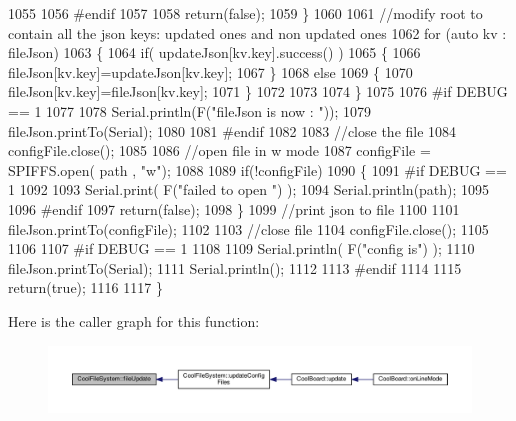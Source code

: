 \begin{DoxyCode}
1055 
1056 \textcolor{preprocessor}{    #endif}
1057 
1058         \textcolor{keywordflow}{return}(\textcolor{keyword}{false});
1059     \}
1060     
1061     \textcolor{comment}{//modify root to contain all the json keys: updated ones and non updated ones}
1062     \textcolor{keywordflow}{for} (\textcolor{keyword}{auto} kv : fileJson) 
1063     \{
1064         \textcolor{keywordflow}{if}( updateJson[kv.key].success() )
1065         \{
1066             fileJson[kv.key]=updateJson[kv.key];            
1067         \}
1068         \textcolor{keywordflow}{else}
1069         \{
1070             fileJson[kv.key]=fileJson[kv.key];
1071         \}
1072 
1073                 
1074     \}
1075 
1076 \textcolor{preprocessor}{#if DEBUG == 1}
1077 
1078     Serial.println(F(\textcolor{stringliteral}{"fileJson is now : "}));
1079     fileJson.printTo(Serial);
1080 
1081 \textcolor{preprocessor}{#endif}
1082 
1083     \textcolor{comment}{//close the file}
1084     configFile.close();
1085 
1086     \textcolor{comment}{//open file in w mode}
1087     configFile = SPIFFS.open( path , \textcolor{stringliteral}{"w"});
1088     
1089     \textcolor{keywordflow}{if}(!configFile)
1090     \{   
1091 \textcolor{preprocessor}{    #if DEBUG == 1}
1092         
1093         Serial.print( F(\textcolor{stringliteral}{"failed to open "}) );
1094         Serial.println(path);
1095 
1096 \textcolor{preprocessor}{    #endif}
1097         \textcolor{keywordflow}{return}(\textcolor{keyword}{false});
1098     \}
1099     \textcolor{comment}{//print json to file    }
1100     
1101     fileJson.printTo(configFile);
1102     
1103     \textcolor{comment}{//close file}
1104     configFile.close();
1105 
1106 
1107 \textcolor{preprocessor}{#if DEBUG == 1}
1108 
1109     Serial.println( F(\textcolor{stringliteral}{"config is"}) );
1110     fileJson.printTo(Serial);
1111     Serial.println();
1112 
1113 \textcolor{preprocessor}{#endif}
1114     
1115     \textcolor{keywordflow}{return}(\textcolor{keyword}{true});
1116     
1117 \}
\end{DoxyCode}
Here is the caller graph for this function\+:\nopagebreak
\begin{figure}[H]
\begin{center}
\leavevmode
\includegraphics[width=350pt]{db/d0c/class_cool_file_system_a13f2958f5b87757c31fc53797a30d23a_icgraph}
\end{center}
\end{figure}
\mbox{\label{class_cool_file_system_a70701d05e811604af1b531f4f6dc69ed}} 
